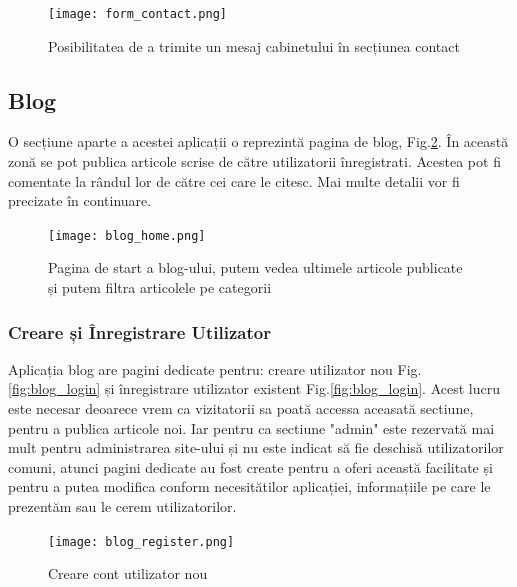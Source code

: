 \documentclass[11pt]{scrartcl} %
\begin{document}
\begin{figure}[h] %
	\centering
	\texttt{[image: form\_contact.png]} %
	\caption{Posibilitatea de a trimite un mesaj cabinetului în secțiunea contact}
	\label{fig:form_contact}
\end{figure}




\subsection{Blog}
 
O secțiune aparte a acestei aplicații o reprezintă pagina de blog, Fig.\ref{fig:blog_home}. În această zonă se pot publica articole scrise de către utilizatorii înregistrati. Acestea pot fi comentate la rândul lor de către cei care le citesc. Mai multe detalii vor fi precizate în continuare.

\begin{figure}[h] %
	\centering
	\texttt{[image: blog\_home.png]} %
	\caption{Pagina de start a blog-ului, putem vedea ultimele articole publicate și putem filtra articolele pe categorii}
	\label{fig:blog_home}
\end{figure}


\subsubsection{Creare și Înregistrare Utilizator}

Aplicația blog are pagini dedicate pentru: creare utilizator nou Fig.\ref{fig:blog_login} și înregistrare utilizator existent Fig.\ref{fig:blog_login}. Acest lucru este necesar deoarece vrem ca vizitatorii sa poată accessa aceasată sectiune, pentru a publica articole noi. Iar pentru ca sectiune "admin" este rezervată mai mult pentru administrarea site-ului și nu este indicat să fie deschisă utilizatorilor comuni, atunci pagini dedicate au fost create pentru a oferi această facilitate și pentru a putea modifica conform necesitătilor aplicației, informațiile pe care le prezentăm sau le cerem utilizatorilor. 

\begin{figure}[h] %
	\centering
	\texttt{[image: blog\_register.png]} %
	\caption{Creare cont utilizator nou}
	\label{fig:blog_register}
\end{figure}
\end{document}
